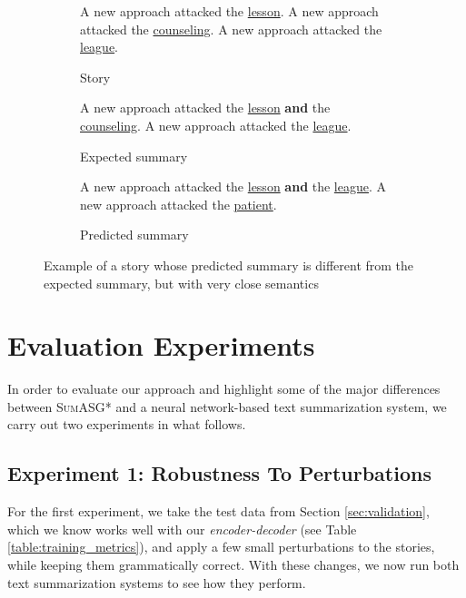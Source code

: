 \begin{figure}[H]
\begin{subfigure}{\textwidth}
\begin{displayquote}
A new approach attacked the \underline{lesson}. A new approach attacked the \underline{counseling}. A new approach attacked the \underline{league}.
\end{displayquote}
\caption{Story}
\vspace{\baselineskip}
\end{subfigure}
\begin{subfigure}{\textwidth}
\begin{displayquote}
A new approach attacked the \underline{lesson} \textbf{and} the \underline{counseling}. A new approach attacked the \underline{league}.
\end{displayquote}
\caption{Expected summary}
\vspace{\baselineskip}
\end{subfigure}
\begin{subfigure}{\textwidth}
\begin{displayquote}
A new approach attacked the \underline{lesson} \textbf{and} the \underline{league}. A new approach attacked the \underline{patient}.
\end{displayquote}
\caption{Predicted summary}
\end{subfigure}
\caption{Example of a story whose predicted summary is different from the expected summary, but with very close semantics}
\label{fig:discrepancy_example}
\end{figure}

\section{Evaluation Experiments}
\label{sec:evaluation_experiments}

In order to evaluate our approach and highlight some of the major differences between \textsc{SumASG*} and a neural network-based text summarization system, we carry out two experiments in what follows.

\subsection{Experiment 1: Robustness To Perturbations}
\label{subsec:experiment_1}

For the first experiment, we take the test data from Section \ref{sec:validation}, which we know works well with our \textit{encoder-decoder} (see Table \ref{table:training_metrics}), and apply a few small perturbations to the stories, while keeping them grammatically correct. With these changes, we now run both text summarization systems to see how they perform.

